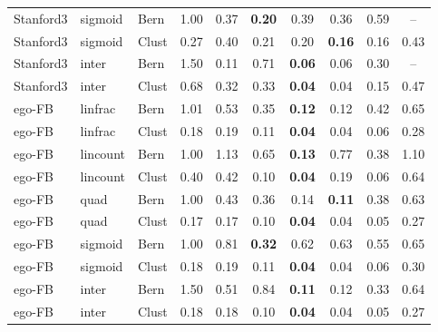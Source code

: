 \documentclass{article}
\begin{document}
\begin{table}[h]
\begin{tabular}{lllccccccc}
Stanford3 & sigmoid & Bern & 1.00 & 0.37 & \textbf{0.20} & 0.39 & 0.36 & 0.59 & -- \\
Stanford3 & sigmoid & Clust & 0.27 & 0.40 & 0.21 & 0.20 & \textbf{0.16} & 0.16 & 0.43 \\
Stanford3 & inter & Bern & 1.50 & 0.11 & 0.71 & \textbf{0.06} & 0.06 & 0.30 & -- \\
Stanford3 & inter & Clust & 0.68 & 0.32 & 0.33 & \textbf{0.04} & 0.04 & 0.15 & 0.47 \\
ego-FB & linfrac & Bern & 1.01 & 0.53 & 0.35 & \textbf{0.12} & 0.12 & 0.42 & 0.65 \\
ego-FB & linfrac & Clust & 0.18 & 0.19 & 0.11 & \textbf{0.04} & 0.04 & 0.06 & 0.28 \\
ego-FB & lincount & Bern & 1.00 & 1.13 & 0.65 & \textbf{0.13} & 0.77 & 0.38 & 1.10 \\
ego-FB & lincount & Clust & 0.40 & 0.42 & 0.10 & \textbf{0.04} & 0.19 & 0.06 & 0.64 \\
ego-FB & quad & Bern & 1.00 & 0.43 & 0.36 & 0.14 & \textbf{0.11} & 0.38 & 0.63 \\
ego-FB & quad & Clust & 0.17 & 0.17 & 0.10 & \textbf{0.04} & 0.04 & 0.05 & 0.27 \\
ego-FB & sigmoid & Bern & 1.00 & 0.81 & \textbf{0.32} & 0.62 & 0.63 & 0.55 & 0.65 \\
ego-FB & sigmoid & Clust & 0.18 & 0.19 & 0.11 & \textbf{0.04} & 0.04 & 0.06 & 0.30 \\
ego-FB & inter & Bern & 1.50 & 0.51 & 0.84 & \textbf{0.11} & 0.12 & 0.33 & 0.64 \\
ego-FB & inter & Clust & 0.18 & 0.18 & 0.10 & \textbf{0.04} & 0.04 & 0.05 & 0.27 \\
\bottomrule\end{tabular}\end{table}

\newpage

\end{document}
